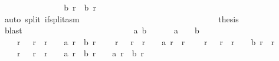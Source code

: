 \begin{isabellebody}
\ \ \ \ \ \ \ \ \ \ \ \ \isamarkupfalse%
\ \isamarkupfalse%
\ {\isachardoublequoteopen}{\isacharquery}b\ r\ {\isacharequal}\ {\isacharquery}b\ {\isacharparenleft}r\ {\isacharminus}\ {}{\isacharparenright}{\isachardoublequoteclose}\isanewline
\ \ \ \ \ \ \ \ \ \ \ \ \ \ \isamarkupfalse%
\ {\isacharasterisk}\isanewline
\ \ \ \ \ \ \ \ \ \ \ \ \ \ \isamarkupfalse%
\ {\isacharparenleft}auto\ split{\isacharcolon}\ if{\isacharunderscore}split{\isacharunderscore}asm{\isacharparenright}\isanewline
\ \ \ \ \ \ \ \ \ \ \isamarkupfalse%
\isanewline
\ \ \ \ \ \ \ \ \ \ \isamarkupfalse%
\isanewline
\ \ \ \ \ \ \ \ \ \ \isamarkupfalse%
\ {\isacharquery}thesis\isanewline
\ \ \ \ \ \ \ \ \ \ \ \ \isamarkupfalse%
\ blast\isanewline
\ \ \ \ \ \ \ \ \isamarkupfalse%
\isanewline
\ \ \ \ \ \ \isamarkupfalse%
\isanewline
\ \ \ \ \isamarkupfalse%
\isanewline
\ \ \isamarkupfalse%
\isanewline
\isanewline
\ \ \isamarkupfalse%
\ a\ b\ \ {\isacharasterisk}{\isacharcolon}\isanewline
\ \ \ \ {\isachardoublequoteopen}a\ {}\ {\isacharequal}\ {}{\isachardoublequoteclose}\ {\isachardoublequoteopen}b\ {}\ {\isacharequal}\ {}{\isachardoublequoteclose}\isanewline
\ \ \ \ {\isachardoublequoteopen}{\isasymforall}r{\isachardot}\ {}\ {\isacharless}\ r\ {\isasymand}\ r\ {\isacharless}\ {}{}{}{}\ {\isasymlongrightarrow}\ a\ r\ {\isasymnoteq}\ b\ r{\isachardoublequoteclose}\isanewline
\ \ \ \ {\isachardoublequoteopen}{\isasymforall}r{\isachardot}\ {}\ {\isacharless}\ r\ {\isasymand}\ r\ {\isacharless}\ {}{}{}{}\ {\isasymlongrightarrow}\ a\ r\ {\isasymle}\ r{\isachardoublequoteclose}\isanewline
\ \ \ \ {\isachardoublequoteopen}{\isasymforall}r{\isachardot}\ {}\ {\isacharless}\ r\ {\isasymand}\ r\ {\isacharless}\ {}{}{}{}\ {\isasymlongrightarrow}\ b\ r\ {\isasymle}\ r{\isachardoublequoteclose}\isanewline
\ \ \ \ {\isachardoublequoteopen}{\isasymforall}r{\isachardot}\ {}\ {\isacharless}\ r\ {\isasymand}\ r\ {\isacharless}\ {}{}{}{}\ {\isasymlongrightarrow}\ a\ r\ {\isacharequal}\ b\ {\isacharparenleft}r\ {\isacharminus}\ {}{\isacharparenright}\ {\isasymor}\ a\ r\ {\isacharequal}\ b\ {\isacharparenleft}r\ {\isacharminus}\ {}{\isacharparenright}\ {\isacharplus}\ {}{\isachardoublequoteclose}\isanewline

\end{isabellebody}
